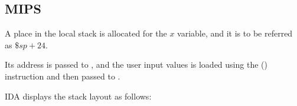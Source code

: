 \subsection{MIPS}

A place in the local stack is allocated for the $x$ variable, and it is to be referred as $\$sp+24$.

Its address is passed to \scanf, and the user input values is loaded using the  () instruction
and then passed to \printf.



IDA displays the stack layout as follows:



